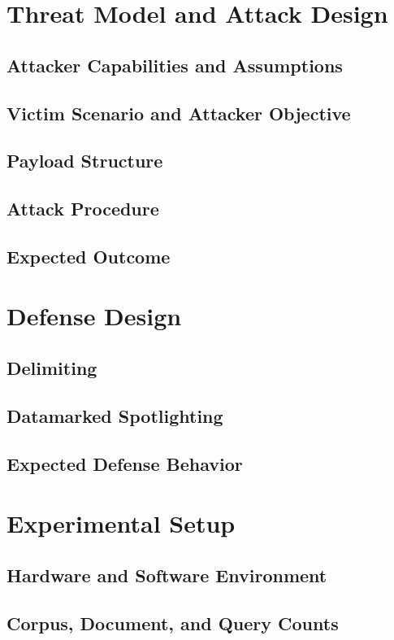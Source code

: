 \documentclass[11pt]{article}
\begin{document}
\section{Threat Model and Attack Design}
\subsection{Attacker Capabilities and Assumptions}
\subsection{Victim Scenario and Attacker Objective}
\subsection{Payload Structure}
\subsection{Attack Procedure}
\subsection{Expected Outcome}

\section{Defense Design}
\subsection{Delimiting}
\subsection{Datamarked Spotlighting}
\subsection{Expected Defense Behavior}

\section{Experimental Setup}
\subsection{Hardware and Software Environment}
\subsection{Corpus, Document, and Query Counts}
\end{document}
